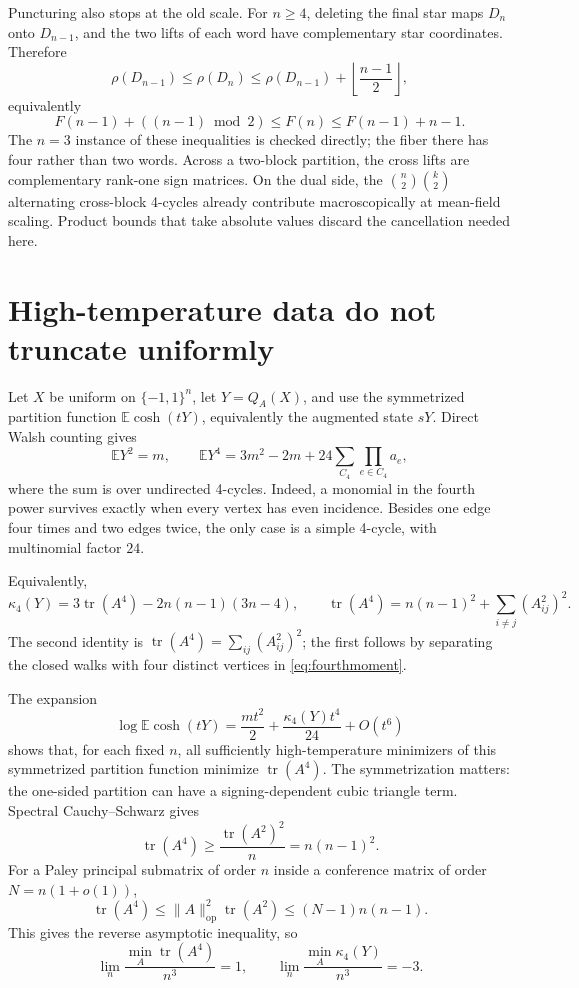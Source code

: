 \documentclass[11pt]{article}
\newcommand{\eps}{\{-1,1\}}
\newcommand{\E}{\mathbb E}
\DeclareMathOperator{\tr}{tr}
\begin{document}
Puncturing also stops at the old scale.  For \(n\ge4\), deleting the final star
maps \(D_n\) onto \(D_{n-1}\), and the two lifts of each word have complementary
star coordinates.  Therefore
\[
 \rho(D_{n-1})\le\rho(D_n)
 \le\rho(D_{n-1})+\left\lfloor\frac{n-1}{2}\right\rfloor,
\]
equivalently
\[
 F(n-1)+((n-1)\bmod2)\le F(n)\le F(n-1)+n-1.
\]
The \(n=3\) instance of these inequalities is checked directly; the fiber
there has four rather than two words.
Across a two-block partition, the cross lifts are complementary rank-one
sign matrices.  On the dual side, the
\(\binom n2\binom k2\) alternating cross-block 4-cycles already contribute
macroscopically at mean-field scaling.  Product bounds that take absolute
values discard the cancellation needed here.

\section{High-temperature data do not truncate uniformly}

Let \(X\) be uniform on \(\eps^n\), let \(Y=Q_A(X)\), and use the symmetrized
partition function \(\E\cosh(tY)\), equivalently the augmented state \(sY\).
Direct Walsh counting gives
\begin{equation}
 \E Y^2=m,
 \qquad
 \E Y^4=3m^2-2m+24\sum_{C_4}\prod_{e\in C_4}a_e,
 \label{eq:fourthmoment}
\end{equation}
where the sum is over undirected 4-cycles.  Indeed, a monomial in the fourth
power survives exactly when every vertex has even incidence.  Besides one
edge four times and two edges twice, the only case is a simple 4-cycle, with
multinomial factor \(24\).

Equivalently,
\begin{equation}
 \kappa_4(Y)=3\tr(A^4)-2n(n-1)(3n-4),
 \qquad
 \tr(A^4)=n(n-1)^2+\sum_{i\ne j}(A^2_{ij})^2.
 \label{eq:tracefour}
\end{equation}
The second identity is \(\tr(A^4)=\sum_{ij}(A^2_{ij})^2\); the first follows
by separating the closed walks with four distinct vertices in
\eqref{eq:fourthmoment}.

The expansion
\[
 \log\E\cosh(tY)=\frac{m t^2}{2}+\frac{\kappa_4(Y)t^4}{24}+O(t^6)
\]
shows that, for each fixed \(n\), all sufficiently high-temperature
minimizers of this symmetrized partition function minimize \(\tr(A^4)\).
The symmetrization matters: the one-sided partition can have a
signing-dependent cubic triangle term.  Spectral Cauchy--Schwarz gives
\[
 \tr(A^4)\ge\frac{\tr(A^2)^2}{n}=n(n-1)^2.
\]
For a Paley principal submatrix of order \(n\) inside a conference matrix of
order \(N=n(1+o(1))\),
\[
 \tr(A^4)\le \|A\|_{\mathrm{op}}^2\tr(A^2)
 \le (N-1)n(n-1).
\]
This gives the reverse asymptotic inequality, so
\[
 \lim_n\frac{\min_A\tr(A^4)}{n^3}=1,
 \qquad
 \lim_n\frac{\min_A\kappa_4(Y)}{n^3}=-3.
\]
\end{document}
